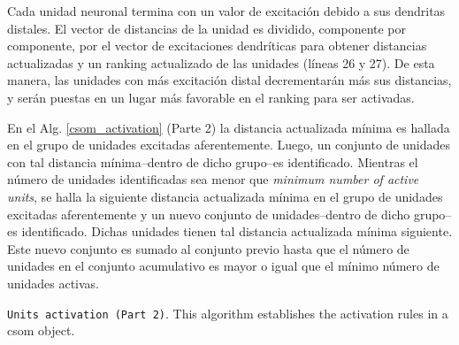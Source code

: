 {Cada unidad neuronal termina con un valor de excitación debido a sus dendritas distales. El vector de distancias de la unidad es dividido, componente por componente, por el vector de excitaciones dendríticas para obtener distancias actualizadas y un ranking actualizado de las unidades (líneas 26 y 27). De esta manera, las unidades con más excitación distal decrementarán más sus distancias, y serán puestas en un lugar más favorable en el ranking para ser activadas.

En el Alg. \ref{csom_activation} (Parte 2) la distancia actualizada mínima es hallada en el grupo de unidades excitadas aferentemente. Luego, un conjunto de unidades con tal distancia mínima--dentro de dicho grupo--es identificado. Mientras el número de unidades identificadas sea menor que \emph{minimum number of active units}, se halla la siguiente distancia actualizada mínima en el grupo de unidades excitadas aferentemente y un nuevo conjunto de unidades--dentro de dicho grupo--es identificado. Dichas unidades tienen tal distancia actualizada mínima siguiente.
Este nuevo conjunto es sumado al conjunto previo hasta que el número de unidades en el conjunto acumulativo es mayor o igual que el mínimo número de unidades activas.

\begin{algorithm}
\ContinuedFloat
\caption{\texttt{Units activation (Part 2)}. This algorithm establishes the activation rules in a \gls{csom} object.}
\label{csom_activation}
\begin{algorithmic}[1]

	\ENDWHILE


\end{algorithmic}
\end{algorithm}}
